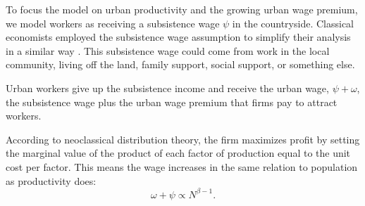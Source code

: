 To focus the model on urban productivity and the growing urban wage premium, we model workers as receiving a \gls{subsistence wage} $\psi$ in the countryside. Classical economists employed the \gls{subsistence wage} assumption to simplify their analysis in a similar way \cite{GET_classical-subsistence-wage}.
%
This subsistence wage could come from work in the local community, living off the land, family support, social support, or something else. 

Urban workers give up the subsistence income and receive the \gls{urban wage}, $\psi +  \omega$, the subsistence wage plus the \gls{urban wage premium} that firms pay to attract workers. 


According to \gls{neoclassical distribution theory}, the firm maximizes profit by setting the marginal value of the product of each \gls{factor of production} equal to the unit cost per factor. This means the wage increases in the same relation to population as \gls{productivity} does:
\begin{equation}
\omega + \psi\propto N^{\beta-1}.
\label{eqn-wage-population}
\end{equation}

